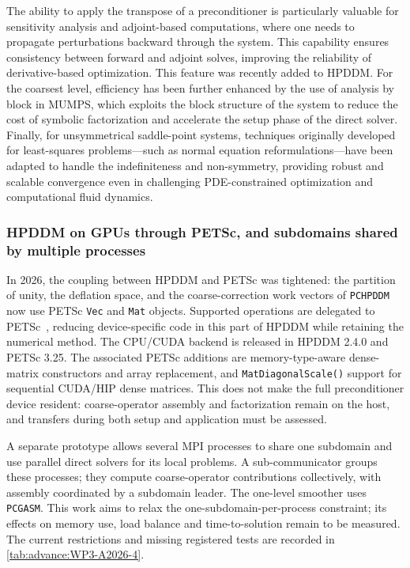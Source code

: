 The ability to apply the transpose of a preconditioner is particularly valuable for sensitivity analysis and adjoint-based computations, where one needs to propagate perturbations backward through the system. This capability ensures consistency between forward and adjoint solves, improving the reliability of derivative-based optimization. This feature was recently added to HPDDM. For the coarsest level, efficiency has been further enhanced by the use of analysis by block in MUMPS, which exploits the block structure of the system to reduce the cost of symbolic factorization and accelerate the setup phase of the direct solver. Finally, for unsymmetrical saddle-point systems, techniques originally developed for least-squares problems—such as normal equation reformulations—have been adapted to handle the indefiniteness and non-symmetry, providing robust and scalable convergence even in challenging PDE-constrained optimization and computational fluid dynamics. 
 
\subsubsection{HPDDM on GPUs through PETSc, and subdomains shared by multiple processes}
\label{sec:wp3:T31:hpddm-petsc}
In 2026, the coupling between HPDDM and PETSc was tightened: the partition of unity, the deflation space, and the coarse-correction work vectors of \texttt{PCHPDDM} now use PETSc \texttt{Vec} and \texttt{Mat} objects.
Supported operations are delegated to PETSc~\cite{balay_petsc_2024}, reducing device-specific code in this part of HPDDM while retaining the numerical method.
The CPU/CUDA backend is released in HPDDM 2.4.0 and PETSc 3.25.
The associated PETSc additions are memory-type-aware dense-matrix constructors and array replacement, and \texttt{MatDiagonalScale()} support for sequential CUDA/HIP dense matrices.
This does not make the full preconditioner device resident: coarse-operator assembly and factorization remain on the host, and transfers during both setup and application must be assessed.

A separate prototype allows several MPI processes to share one subdomain and use parallel direct solvers for its local problems.
A sub-communicator groups these processes; they compute coarse-operator contributions collectively, with assembly coordinated by a subdomain leader.
The one-level smoother uses \texttt{PCGASM}.
This work aims to relax the one-subdomain-per-process constraint; its effects on memory use, load balance and time-to-solution remain to be measured.
The current restrictions and missing registered tests are recorded in \cref{tab:advance:WP3-A2026-4}.

